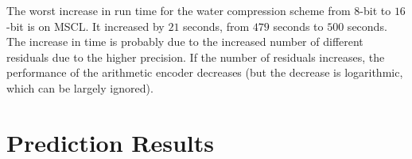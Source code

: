 \documentclass[a4paper]{report}
\begin{document}
The worst increase in run time for the water compression scheme from $8$-bit
to $16$-bit is on MSCL. It increased by $21$ seconds, from $479$ seconds to
$500$ seconds. The increase in time is probably due to the increased number of
different residuals due to the higher precision. If the number of residuals
increases, the performance of the arithmetic encoder decreases (but the
decrease is logarithmic, which can be largely ignored).


\section{Prediction Results}

\begin{table}
\centering
{}
\end{table}
\end{document}
